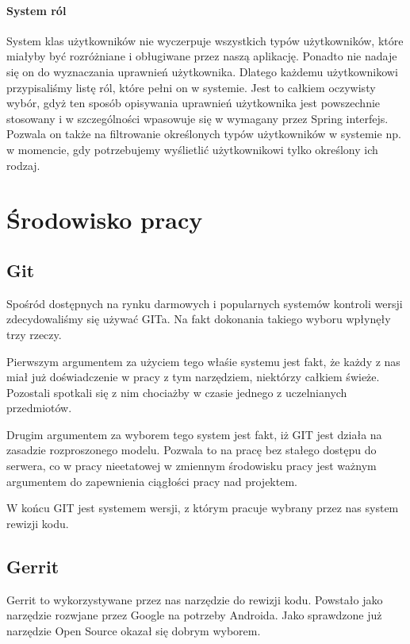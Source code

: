 \documentclass[licencjacka]{pracamgr}
\begin{document}
\paragraph{System ról}
System klas użytkowników nie wyczerpuje wszystkich typów użytkowników, które miałyby być rozróżniane i obługiwane przez naszą aplikację. Ponadto nie nadaje się on do wyznaczania uprawnień użytkownika. Dlatego każdemu użytkownikowi przypisaliśmy listę ról, które pełni on w systemie. Jest to całkiem oczywisty wybór, gdyż ten sposób opisywania uprawnień użytkownika jest powszechnie stosowany i w szczególności wpasowuje się w wymagany przez Spring interfejs. Pozwala on także na filtrowanie określonych typów użytkowników w systemie np. w momencie, gdy potrzebujemy wyślietlić użytkownikowi tylko określony ich rodzaj.

\section{Środowisko pracy}

\subsection{Git}
Spośród dostępnych na rynku darmowych i popularnych systemów kontroli wersji zdecydowaliśmy się używać GITa. Na fakt dokonania takiego wyboru wpłynęły trzy rzeczy.

Pierwszym argumentem za użyciem tego właśie systemu jest fakt, że każdy z nas miał już doświadczenie w pracy z tym narzędziem, niektórzy całkiem świeże. Pozostali spotkali się z nim chociażby w czasie jednego z uczelnianych przedmiotów.
  
Drugim argumentem za wyborem tego system jest fakt, iż GIT jest działa na zasadzie rozproszonego modelu. Pozwala to na pracę bez stałego dostępu do serwera, co w pracy nieetatowej w zmiennym środowisku pracy jest ważnym argumentem do zapewnienia ciągłości pracy nad projektem.

W końcu GIT jest systemem wersji, z którym pracuje wybrany przez nas system rewizji kodu.

\subsection{Gerrit}
Gerrit to wykorzystywane przez nas narzędzie do rewizji kodu. Powstało jako narzędzie rozwjane przez Google na potrzeby Androida. Jako sprawdzone już narzędzie Open Source okazał się dobrym wyborem.\\
\end{document}
